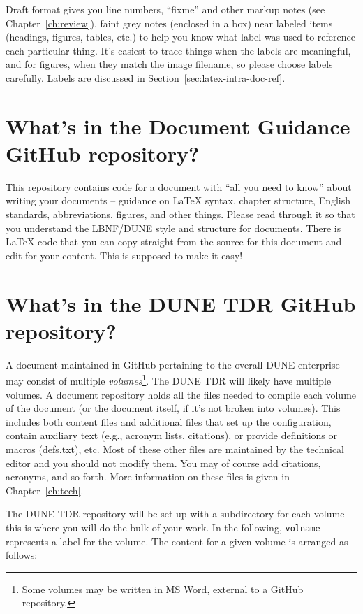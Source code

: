 Draft format gives you line numbers, ``fixme'' and other markup notes (see Chapter~\ref{ch:review}), 
faint grey notes (enclosed in a box) near labeled items (headings, figures, tables, etc.) to help you know 
what label was used to reference each particular thing.  
It's easiest to trace things when the labels are meaningful, and for figures, when they match the image filename, so please choose labels carefully. Labels are discussed in Section~\ref{sec:latex-intra-doc-ref}.

\section{What's in the Document Guidance GitHub repository?}
\label{sec:gen-guidance-repo}

This repository contains code for a document with ``all you need to know'' about writing your documents -- guidance on \LaTeX{} syntax, chapter structure, English standards, abbreviations, figures, and other things. Please read through it so that you understand the LBNF/DUNE style and structure for documents.  There is \LaTeX{} code that you can copy straight from the source for this document and edit for your content.  This is supposed to make it easy!


\section{What's in the DUNE TDR GitHub repository?}
\label{sec:gen-repo}

A document maintained in GitHub pertaining to the overall DUNE enterprise may consist of multiple \textit{volumes}\footnote{Some volumes may be written in MS Word, external to a GitHub repository.}. The DUNE TDR will likely have multiple volumes.  A document repository holds all the files needed to compile each volume of the document (or the document itself, if it's not broken into volumes). This includes both content files and additional files that set up the configuration, 
contain auxiliary text (e.g., acronym lists, citations), or provide definitions or macros (defs.txt), etc.  Most of these other files are maintained by the technical editor and you should not modify them. You may of course add citations, acronyms, and so forth.   More information on these files is given in Chapter~\ref{ch:tech}.

The DUNE TDR repository will be set up with a subdirectory for each volume -- this is where you will do the bulk of your work. In the following, \texttt{volname} represents a label for the volume. The content for a given volume is
arranged as follows:

